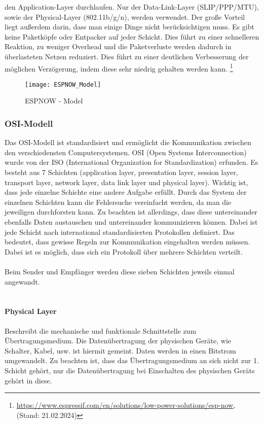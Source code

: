 \documentclass[titlepage,12pt,twoside]{article}
\begin{document}
den Application-Layer durchlaufen. Nur der Data-Link-Layer (SLIP/PPP/MTU), 
sowie der Physical-Layer (802.11b/g/n), werden verwendet. 
Der große Vorteil liegt außerdem 
darin, dass man einige Dinge nicht berücksichtigen muss. Es gibt keine 
Paketköpfe oder Entpacker auf jeder Schicht. Dies führt zu einer schnelleren 
Reaktion, zu weniger Overhead und die Paketverluste werden dadurch in überlasteten Netzen 
reduziert. Dies führt zu einer deutlichen Verbesserung der möglichen 
Verzögerung, indem diese sehr niedrig gehalten werden kann. \footnote{\url{https://www.espressif.com/en/solutions/low-power-solutions/esp-now}, (Stand: 21.02.2024)} \\
\begin{figure}[H]
	\begin{center}
		\scalebox{1.0}
		{\texttt{[image: ESPNOW\_Model]}}
		\caption{ESPNOW - Model}
		\label{fig:ESPNOW_Model}
	\end{center}
\end{figure}

\subsubsection{OSI-Modell}
\label{chap:OSI-Modell}
Das OSI-Modell ist standardisiert und ermöglicht die Kommunikation zwischen den 
verschiedensten Computersystemen. OSI (Open Systems Interconnection) wurde von der 
ISO (International Organization for Standardization) erfunden. 
Es besteht aus 7 Schichten (application layer, presentation layer, session layer, 
transport layer, network layer, data link layer und physical layer). Wichtig ist, 
dass jede einzelne Schichte eine andere Aufgabe erfüllt. Durch das System der 
einzelnen Schichten kann die Fehlersuche vereinfacht werden, da man die jeweiligen 
durchforsten kann. Zu beachten ist allerdings, dass diese untereinander ebenfalls 
Daten austauschen und untereinander kommunizieren können. Dabei ist jede Schicht 
nach international standardisierten Protokollen definiert. Das bedeutet, dass gewisse 
Regeln zur Kommunikation eingehalten werden müssen. Dabei ist es möglich, dass sich 
ein Protokoll über mehrere Schichten verteilt. \\
\\
Beim Sender und Empfänger werden diese sieben Schichten jeweils einmal angewandt. \\
\\

\paragraph{Physical Layer}
\label{par:Physical Layer}
\hfill \break
\hfill \break
Beschreibt die mechanische und funktionale Schnittstelle zum Übertragungsmedium. Die 
Datenübertragung der physischen Geräte, wie Schalter, Kabel, usw. ist hiermit gemeint. 
Daten werden in einen Bitstrom umgewandelt. Zu beachten ist, dass das Übertragungsmedium 
an sich nicht zur 1. Schicht gehört, nur die Datenübertragung bei Einschalten des 
physischen Geräts gehört in diese.\\
\end{document}
